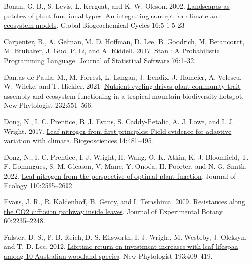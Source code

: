\documentclass[
  12pt,
  letterpaper,
  DIV=11,
  numbers=noendperiod]{scrartcl}
\newlength{\cslhangindent}
\newlength{\cslentryspacingunit} %
\newenvironment{CSLReferences}[2] %
 {%
  \setlength{\parindent}{0pt}
  \ifodd #1
  \let\oldpar\par
  \def\par{\hangindent=\cslhangindent\oldpar}
  \fi
  \setlength{\parskip}{#2\cslentryspacingunit}
 }%
 {}
\begin{document}
\hypertarget{refs}{}
\begin{CSLReferences}{1}{0}
\leavevmode{}%
Bonan, G. B., S. Levis, L. Kergoat, and K. W. Oleson. 2002.
\href{https://doi.org/10.1029/2000GB001360}{Landscapes as patches of
plant functional types: {An} integrating concept for climate and
ecosystem models}. Global Biogeochemical Cycles 16:5-1-5-23.

\leavevmode{}%
Carpenter, B., A. Gelman, M. D. Hoffman, D. Lee, B. Goodrich, M.
Betancourt, M. Brubaker, J. Guo, P. Li, and A. Riddell. 2017.
\href{https://doi.org/10.18637/jss.v076.i01}{Stan : {A Probabilistic
Programming Language}}. Journal of Statistical Software 76:1--32.

\leavevmode{}%
Dantas de Paula, M., M. Forrest, L. Langan, J. Bendix, J. Homeier, A.
Velescu, W. Wilcke, and T. Hickler. 2021.
\href{https://doi.org/10.1111/nph.17600}{Nutrient cycling drives plant
community trait assembly and ecosystem functioning in a tropical
mountain biodiversity hotspot}. New Phytologist 232:551--566.

\leavevmode{}%
Dong, N., I. C. Prentice, B. J. Evans, S. Caddy-Retalic, A. J. Lowe, and
I. J. Wright. 2017. \href{https://doi.org/10.5194/bg-14-481-2017}{Leaf
nitrogen from first principles: Field evidence for adaptive variation
with climate}. Biogeosciences 14:481--495.

\leavevmode{}%
Dong, N., I. C. Prentice, I. J. Wright, H. Wang, O. K. Atkin, K. J.
Bloomfield, T. F. Domingues, S. M. Gleason, V. Maire, Y. Onoda, H.
Poorter, and N. G. Smith. 2022.
\href{https://doi.org/10.1111/1365-2745.13967}{Leaf nitrogen from the
perspective of optimal plant function}. Journal of Ecology
110:2585--2602.

\leavevmode{}%
Evans, J. R., R. Kaldenhoff, B. Genty, and I. Terashima. 2009.
\href{https://doi.org/10.1093/jxb/erp117}{Resistances along the {CO2}
diffusion pathway inside leaves}. Journal of Experimental Botany
60:2235--2248.

\leavevmode{}%
Falster, D. S., P. B. Reich, D. S. Ellsworth, I. J. Wright, M. Westoby,
J. Oleksyn, and T. D. Lee. 2012.
\href{https://doi.org/10.1111/j.1469-8137.2011.03940.x}{Lifetime return
on investment increases with leaf lifespan among 10 {Australian}
woodland species}. New Phytologist 193:409--419.


\end{CSLReferences}
\end{document}
